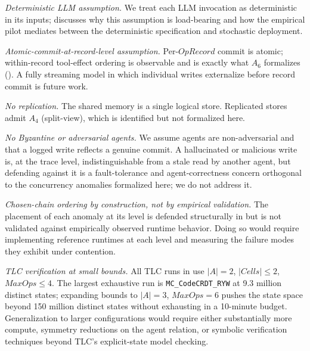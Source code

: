 \documentclass[journal,compsoc,10pt]{IEEEtran}
\providecommand{\citep}{\cite}
\theoremstyle{definition}
\theoremstyle{remark}
\newcommand{\fld}[1]{\mathit{#1}}
\begin{document}
\emph{Deterministic LLM assumption.}
We treat each LLM invocation as deterministic in its inputs;
 discusses why this assumption is
load-bearing and how the empirical pilot mediates between the
deterministic specification and stochastic deployment.

\emph{Atomic-commit-at-record-level assumption.}
Per-$\fld{OpRecord}$ commit is atomic; within-record tool-effect
ordering is observable and is exactly what $A_6$ formalizes
(). A fully streaming model in which
individual writes externalize before record commit is future work.

\emph{No replication.}
The shared memory is a single logical store. Replicated stores admit
$A_4$ (split-view), which is identified but not formalized here.

\emph{No Byzantine or adversarial agents.}
We assume agents are non-adversarial and that a logged write reflects a
genuine commit. A hallucinated or malicious write is, at the trace level,
indistinguishable from a stale read by another agent, but defending against
it is a fault-tolerance and agent-correctness concern
\citep{LamportShostakPease1982Byzantine} orthogonal to the concurrency
anomalies formalized here; we do not address it.

\emph{Chosen-chain ordering by construction, not by empirical validation.}
The placement of each anomaly at its level is defended structurally
in  but is not validated against
empirically observed runtime behavior. Doing so would require
implementing reference runtimes at each level and measuring the
failure modes they exhibit under contention.

\emph{TLC verification at small bounds.}
All TLC runs in  use $|A| = 2$, $|\fld{Cells}|
\leq 2$, $\fld{MaxOps} \leq 4$. The largest exhaustive run is
\texttt{MC\_CodeCRDT\_RYW} at 9.3 million distinct states; expanding
bounds to $|A|=3$, $\fld{MaxOps}=6$ pushes the state space beyond
150 million distinct states without exhausting in a 10-minute
budget. Generalization to larger configurations would require either
substantially more compute, symmetry reductions on the agent
relation, or symbolic verification techniques beyond TLC's
explicit-state model checking.
\end{document}
